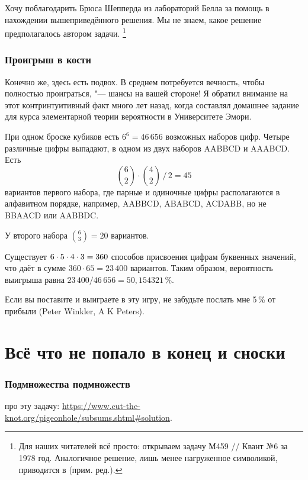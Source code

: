\documentclass[twoside]{book}
\begin{document}
Хочу поблагодарить Брюса Шепперда %
из лабораторий Белла %
за помощь в нахождении вышеприведённого решения.
Мы не знаем, какое решение предполагалось автором задачи.%
\footnote{Для наших читателей всё просто: открываем задачу М459 /\!/ Квант №6 за 1978 год.
Аналогичное решение, лишь менее нагруженное символикой, приводится в \cite[№240]{ВсМО} (прим. ред.). }

\subsubsection*{Проигрыш в кости}%

Конечно же, здесь есть подвох.
В среднем потребуется вечность, чтобы полностью проиграться, "--- шансы на вашей стороне! 
Я обратил внимание на этот контринтуитивный факт много лет назад, когда составлял домашнее задание для курса элементарной теории вероятности в Университете Эмори.

При одном броске кубиков есть $6^6 =46\,656$ возможных наборов цифр.
Четыре различные цифры выпадают, в одном из двух наборов AABBCD и AAABCD.
Есть
\[\binom62\cdot\binom42\,\big/\,2=45\]
вариантов первого набора, где парные и одиночные цифры располагаются в алфавитном порядке, например, AABBCD, ABABCD, ACDABB, но не BBAACD или AABBDC.

У второго набора $\binom63=20$  вариантов.

Существует $6\cdot 5\cdot 4\cdot 3\z=360$ способов присвоения цифрам буквенных значений, что даёт в сумме $360\cdot 65=23\,400$ вариантов.
Таким образом, вероятность выигрыша равна
$23\,400/46\,656 = 50{,}154321\,\%$.
\heart

Если вы поставите и выиграете в эту игру, не забудьте послать мне 5\,\% от прибыли 
(Peter Winkler,  A  K Peters).

\section*{Всё что не попало в конец и сноски}

\subsubsection*{Подмножества подмножеств}
 про эту задачу: \url{https://www.cut-the-knot.org/pigeonhole/subsums.shtml#solution}.
\end{document}

